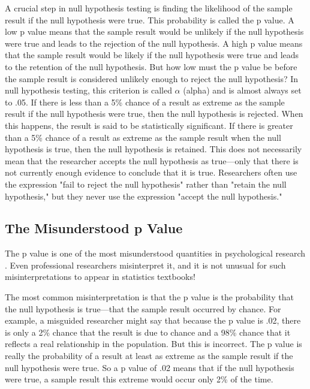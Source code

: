 A crucial step in null hypothesis testing is finding the likelihood of the sample result if the null hypothesis were true. This probability is called the p value. A low p value means that the sample result would be unlikely if the null hypothesis were true and leads to the rejection of the null hypothesis. A high p value means that the sample result would be likely if the null hypothesis were true and leads to the retention of the null hypothesis. But how low must the p value be before the sample result is considered unlikely enough to reject the null hypothesis? In null hypothesis testing, this criterion is called $\alpha$ (alpha) and is almost always set to .05. If there is less than a 5\% chance of a result as extreme as the sample result if the null hypothesis were true, then the null hypothesis is rejected. When this happens, the result is said to be statistically significant. If there is greater than a 5\% chance of a result as extreme as the sample result when the null hypothesis is true, then the null hypothesis is retained. This does not necessarily mean that the researcher accepts the null hypothesis as true---only that there is not currently enough evidence to conclude that it is true. Researchers often use the expression "fail to reject the null hypothesis" rather than "retain the null hypothesis," but they never use the expression "accept the null hypothesis."



\subsection{The Misunderstood p Value}


The p value is one of the most misunderstood quantities in psychological research \citep{cohen_world_1994}. Even professional researchers misinterpret it, and it is not unusual for such misinterpretations to appear in statistics textbooks!


The most common misinterpretation is that the p value is the probability that the null hypothesis is true---that the sample result occurred by chance. For example, a misguided researcher might say that because the p value is .02, there is only a 2\% chance that the result is due to chance and a 98\% chance that it reflects a real relationship in the population. But this is incorrect. The p value is really the probability of a result at least as extreme as the sample result if the null hypothesis were true. So a p value of .02 means that if the null hypothesis were true, a sample result this extreme would occur only 2\% of the time.


